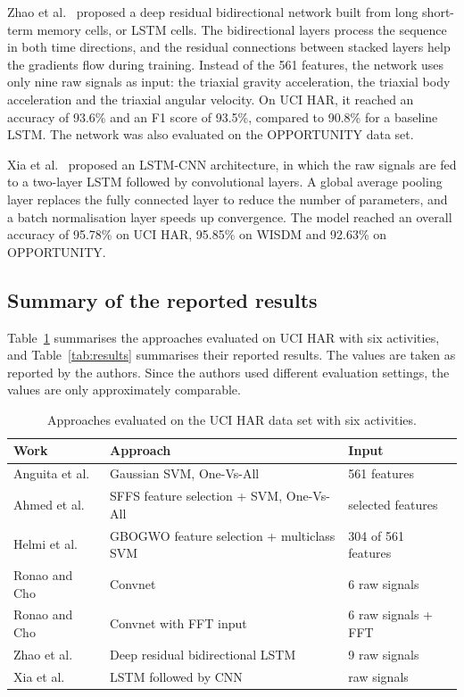 \documentclass[a4paper, 11pt]{article}
\begin{document}
Zhao et al.~\cite{zhao2018} proposed a deep residual bidirectional network built from long short-term memory cells, or LSTM cells. The bidirectional layers process the sequence in both time directions, and the residual connections between stacked layers help the gradients flow during training. Instead of the 561 features, the network uses only nine raw signals as input: the triaxial gravity acceleration, the triaxial body acceleration and the triaxial angular velocity. On UCI HAR, it reached an accuracy of 93.6\% and an F1 score of 93.5\%, compared to 90.8\% for a baseline LSTM. The network was also evaluated on the OPPORTUNITY data set.

Xia et al.~\cite{xia2020} proposed an LSTM-CNN architecture, in which the raw signals are fed to a two-layer LSTM followed by convolutional layers. A global average pooling layer replaces the fully connected layer to reduce the number of parameters, and a batch normalisation layer speeds up convergence. The model reached an overall accuracy of 95.78\% on UCI HAR, 95.85\% on WISDM and 92.63\% on OPPORTUNITY.

\subsection{Summary of the reported results}

Table~\ref{tab:approaches} summarises the approaches evaluated on UCI HAR with six activities, and Table~\ref{tab:results} summarises their reported results. The values are taken as reported by the authors. Since the authors used different evaluation settings, the values are only approximately comparable.

\begin{table}[ht]
\centering
\small
\renewcommand{\arraystretch}{1.4}
\begin{tabularx}{\textwidth}{@{}l >{\raggedright\arraybackslash}X l@{}}
\toprule
\textbf{Work} & \textbf{Approach} & \textbf{Input} \\
\midrule
Anguita et al.~\cite{anguita2013} & Gaussian SVM, One-Vs-All & 561 features \\
\midrule
Ahmed et al.~\cite{ahmed2020} & SFFS feature selection + SVM, One-Vs-All & selected features \\
\midrule
Helmi et al.~\cite{helmi2021} & GBOGWO feature selection + multiclass SVM & 304 of 561 features \\
\midrule
Ronao and Cho~\cite{ronao2016} & Convnet & 6 raw signals \\
\midrule
Ronao and Cho~\cite{ronao2016} & Convnet with FFT input & 6 raw signals + FFT \\
\midrule
Zhao et al.~\cite{zhao2018} & Deep residual bidirectional LSTM & 9 raw signals \\
\midrule
Xia et al.~\cite{xia2020} & LSTM followed by CNN & raw signals \\
\bottomrule
\end{tabularx}
\caption{Approaches evaluated on the UCI HAR data set with six activities.}
\label{tab:approaches}
\end{table}
\end{document}
